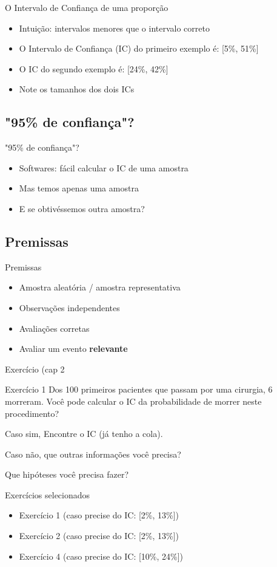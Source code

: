 \documentclass{beamer}
\begin{document}
\begin{frame}{O Intervalo de Confiança de uma proporção}
  \begin{itemize}
  \item Intuição: intervalos menores que o intervalo correto
  \item O \alert{Intervalo de Confiança} (IC) do primeiro exemplo é: [5\%, 51\%]
  \item O IC do segundo exemplo é: [24\%, 42\%]
  \item<2-> Note os tamanhos dos dois ICs
  \end{itemize}
\end{frame}


\subsection{"95\% de confiança"?}

\begin{frame}{"95\% de confiança"?}
  \begin{itemize}
  \item Softwares: fácil calcular o IC de uma amostra
  \item Mas temos apenas \alert{uma} amostra
  \item E se obtivéssemos outra amostra?
  \end{itemize}
\end{frame}

\subsection{Premissas}

\begin{frame}{Premissas}
  \begin{itemize}
  \item Amostra aleatória / amostra representativa
  \item Observações independentes
  \item Avaliações corretas
  \item Avaliar um evento {\bf relevante}
  \end{itemize}
\end{frame}

\begin{frame}{Exercício (cap 2}
  \begin{block}{Exercício 1}
    Dos 100 primeiros pacientes que passam por uma cirurgia, 6 morreram.
    Você pode calcular o IC da probabilidade de morrer neste procedimento?

    Caso sim, Encontre o IC (já tenho a cola).

    Caso não, que outras informações você precisa?

    Que hipóteses você precisa fazer?
  \end{block}
\end{frame}

\begin{frame}{Exercícios selecionados}
  \begin{itemize}
  \item Exercício 1 (caso precise do IC: [2\%, 13\%])
  \item Exercício 2 (caso precise do IC: [2\%, 13\%])
  \item Exercício 4 (caso precise do IC: [10\%, 24\%])
  \end{itemize}
\end{frame}
\end{document}
